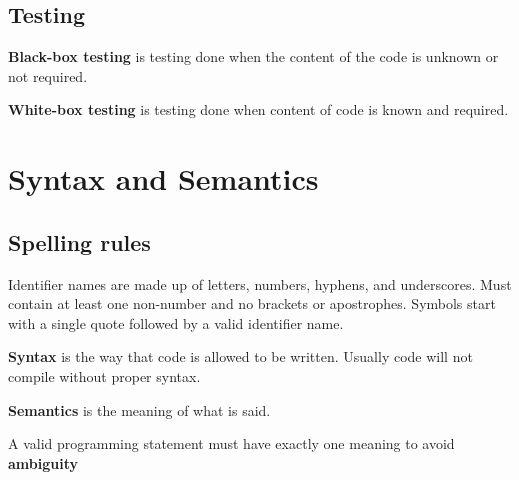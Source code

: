 \documentclass[english, 12pt]{article}
\begin{document}
\subsection{Testing}
\begin{defn}
\textbf{Black-box testing} is testing done when the content of the code is unknown or not required.
\end{defn}
\begin{defn}
\textbf{White-box testing} is testing done when content of code is known and required.
\end{defn}
\section{Syntax and Semantics}
\subsection{Spelling rules}
Identifier names are made up of letters, numbers, hyphens, and underscores. Must contain at least one non-number and no brackets or apostrophes. Symbols start with a single quote followed by a valid identifier name.
\begin{defn}
\textbf{Syntax} is the way that code is allowed to be written. Usually code will not compile without proper syntax.
\end{defn}
\begin{defn}
\textbf{Semantics} is the meaning of what is said.
\end{defn}
\begin{defn}
A valid programming statement must have exactly one meaning to avoid \textbf{ambiguity}
\end{defn}
\end{document}
